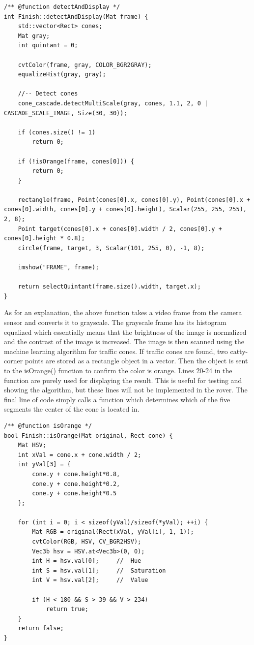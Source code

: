 \documentclass[10pt,letterpaper,onecolumn,draftclsnofoot,journal]{IEEEtran}
\begin{document}
\clearpage
\begin{minipage}{\textwidth}
\begin{lstlisting}
/** @function detectAndDisplay */
int Finish::detectAndDisplay(Mat frame) {
	std::vector<Rect> cones;
	Mat gray;
	int quintant = 0;

	cvtColor(frame, gray, COLOR_BGR2GRAY);
	equalizeHist(gray, gray);

	//-- Detect cones
	cone_cascade.detectMultiScale(gray, cones, 1.1, 2, 0 | CASCADE_SCALE_IMAGE, Size(30, 30));

	if (cones.size() != 1)
		return 0;

	if (!isOrange(frame, cones[0])) {
		return 0;
	}

	rectangle(frame, Point(cones[0].x, cones[0].y), Point(cones[0].x + cones[0].width, cones[0].y + cones[0].height), Scalar(255, 255, 255), 2, 8);
	Point target(cones[0].x + cones[0].width / 2, cones[0].y + cones[0].height * 0.8);
	circle(frame, target, 3, Scalar(101, 255, 0), -1, 8);

	imshow("FRAME", frame);

	return selectQuintant(frame.size().width, target.x);
}
\end{lstlisting}
\end{minipage}
\par
As for an explanation, the above function takes a video frame from the camera sensor and converts it to grayscale. The grayscale frame has its histogram equalized which essentially means that the brightness of the image is normalized and the contrast of the image is increased. The image is then scanned using the machine learning algorithm for traffic cones. If traffic cones are found, two catty-corner points are stored as a rectangle object in a vector. Then the object is sent to the isOrange() function to confirm the color is orange. Lines 20-24 in the function are purely used for displaying the result. This is useful for testing and showing the algorithm, but these lines will not be implemented in the rover. The final line of code simply calls a function which determines which of the five segments the center of the cone is located in.
\vspace{.3cm}
\par
\begin{minipage}{\textwidth}
\begin{lstlisting}
/** @function isOrange */
bool Finish::isOrange(Mat original, Rect cone) {
	Mat HSV;
	int xVal = cone.x + cone.width / 2;
	int yVal[3] = { 
		cone.y + cone.height*0.8, 
		cone.y + cone.height*0.2, 
		cone.y + cone.height*0.5 
	};
	
	for (int i = 0; i < sizeof(yVal)/sizeof(*yVal); ++i) {
		Mat RGB = original(Rect(xVal, yVal[i], 1, 1));
		cvtColor(RGB, HSV, CV_BGR2HSV);
		Vec3b hsv = HSV.at<Vec3b>(0, 0);
		int H = hsv.val[0];		//	Hue
		int S = hsv.val[1];		//	Saturation
		int V = hsv.val[2];		//	Value

		if (H < 180 && S > 39 && V > 234)
			return true;
	}
	return false;
}
\end{lstlisting}
\end{minipage}
\end{document}
